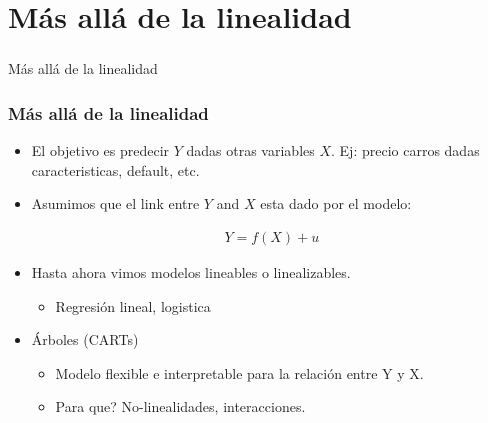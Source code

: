 \documentclass[
  shownotes,
  xcolor={svgnames},
  hyperref={colorlinks,citecolor=DarkBlue,linkcolor=DarkRed,urlcolor=DarkBlue}
  , aspectratio=169]{beamer}
\begin{document}
\section{Más allá de la linealidad}

\begin{frame}[fragile]
\frametitle{}


\centering
{\huge \textcolor{andesred}{Más allá de la linealidad}}



\end{frame}
\begin{frame}
\frametitle{Más allá de la linealidad}


    \begin{itemize}
      \item El objetivo es predecir $Y$ dadas otras variables $X$. Ej: precio carros dadas caracteristicas, default, etc.
      \bigskip
      \item Asumimos que el link entre $Y$ and $X$ esta dado por el modelo:

        \bigskip
        \begin{align}
          Y = f(X) + u
        \end{align}

    \item Hasta ahora vimos modelos lineables o linealizables.
    \begin{itemize}
      \item Regresión lineal, logistica
    \end{itemize}


  \item Árboles (CARTs) 
  \begin{itemize}
    \item Modelo flexible e interpretable para la relación entre Y y X.
    \item Para que? No-linealidades,  interacciones.
  \end{itemize}
    
 
\end{itemize}





\end{frame}
\end{document}
